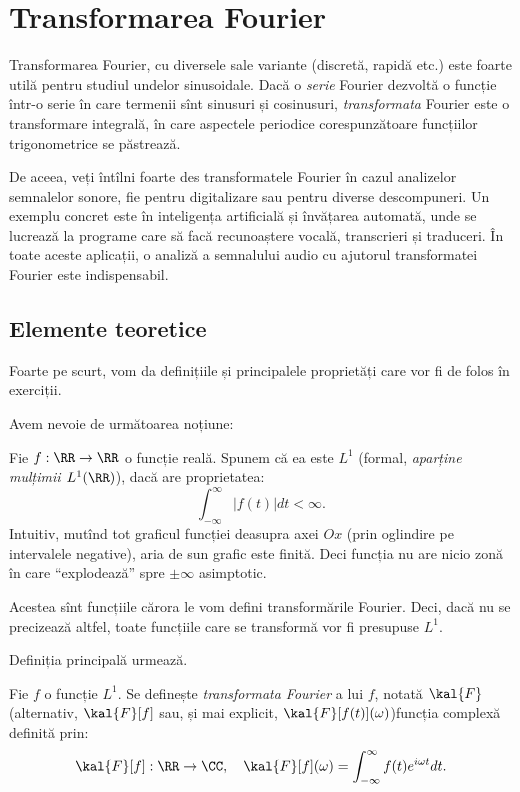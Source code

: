\chapter{Transformarea Fourier}

Transformarea Fourier, cu diversele sale variante (discretă, rapidă etc.)
este foarte utilă pentru studiul undelor sinusoidale. Dacă o \emph{serie}
Fourier dezvoltă o funcție într-o serie în care termenii sînt sinusuri
și cosinusuri, \emph{transformata} Fourier este o transformare integrală,
în care aspectele periodice corespunzătoare funcțiilor trigonometrice
se păstrează.

De aceea, veți întîlni foarte des transformatele Fourier în cazul analizelor
semnalelor sonore, fie pentru digitalizare sau pentru diverse descompuneri.
Un exemplu concret este în inteligența artificială și învățarea automată,
unde se lucrează la programe care să facă recunoaștere vocală, transcrieri
și traduceri. În toate aceste aplicații, o analiză a semnalului audio cu
ajutorul transformatei Fourier este indispensabil.

\section{Elemente teoretice}

Foarte pe scurt, vom da definițiile și principalele proprietăți care vor
fi de folos în exerciții.

Avem nevoie de următoarea noțiune:
\begin{definition}\label{def:functie-l1}
  Fie $ f : \RR \to \RR $ o funcție reală. Spunem că ea este $ L^1 $
  (formal, \emph{aparține mulțimii $ L^1(\RR) $}), dacă are proprietatea:
  \[
    \int_{-\infty}^\infty |f(t)| dt < \infty.
  \]
  Intuitiv, mutînd tot graficul funcției deasupra axei $ Ox $ (prin
  oglindire pe intervalele negative), aria de sun grafic este finită.
  Deci funcția nu are nicio zonă în care \enquote{explodează} spre
  $ \pm \infty $ asimptotic.
\end{definition}

Acestea sînt funcțiile cărora le vom defini transformările Fourier. Deci,
dacă nu se precizează altfel, toate funcțiile care se transformă vor fi
presupuse $ L^1 $.

Definiția principală urmează.

\begin{definition}\label{def:transf-f}
  Fie $ f $ o funcție $ L^1 $. Se definește \emph{transformata Fourier} a lui
  $ f $, notată $ \kal{F} $ (alternativ, $ \kal{F}[f] $ sau, și mai
  explicit, $ \kal{F}[f(t)](\omega) $)\footnotemark funcția complexă
  definită prin:
  \[
    \kal{F}[f] : \RR \to \CC, \quad \kal{F}[f](\omega) = %
    \int_{-\infty}^\infty f(t) e^{i\omega t} dt.
  \]
\end{definition}

